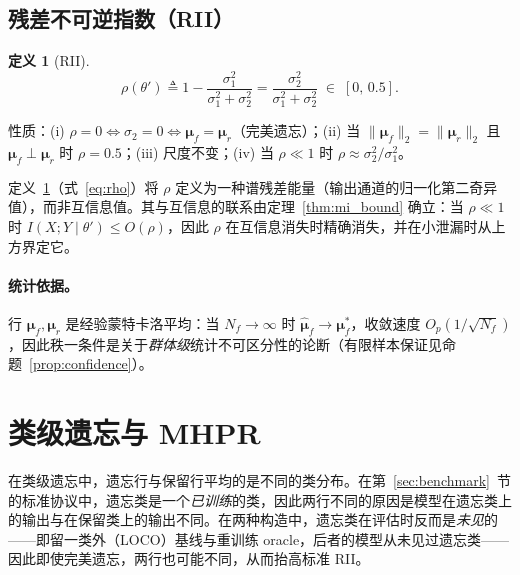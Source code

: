 \documentclass[11pt,a4paper]{article}
\newtheorem{definition}[theorem]{定义}
\newcommand{\coloneqq}{\triangleq}
\begin{document}
\subsection{残差不可逆指数（RII）}

\begin{definition}[RII]
\label{def:rii}
\begin{equation}
\rho(\theta') \coloneqq 1 - \frac{\sigma_1^2}{\sigma_1^2 + \sigma_2^2}
= \frac{\sigma_2^2}{\sigma_1^2 + \sigma_2^2}
\;\in\; [0,\,0.5].
\label{eq:rho}
\end{equation}
\end{definition}

性质：(i) $\rho = 0 \iff \sigma_2 = 0 \iff \boldsymbol{\mu}_f = \boldsymbol{\mu}_r$（完美遗忘）；(ii) 当 $\|\boldsymbol{\mu}_f\|_2=\|\boldsymbol{\mu}_r\|_2$ 且 $\boldsymbol{\mu}_f \perp \boldsymbol{\mu}_r$ 时 $\rho = 0.5$；(iii) 尺度不变；(iv) 当 $\rho \ll 1$ 时 $\rho \approx \sigma_2^2/\sigma_1^2$。

定义~\ref{def:rii}（式~\eqref{eq:rho}）将 $\rho$ 定义为一种谱残差能量（输出通道的归一化第二奇异值），而非互信息值。其与互信息的联系由定理~\ref{thm:mi_bound} 确立：当 $\rho\ll1$ 时 $I(X;Y\mid\theta')\le O(\rho)$，因此 $\rho$ 在互信息消失时精确消失，并在小泄漏时从上方界定它。

\paragraph{统计依据。}
行 $\boldsymbol{\mu}_f, \boldsymbol{\mu}_r$ 是经验蒙特卡洛平均：当 $N_f\to\infty$ 时 $\hat{\boldsymbol{\mu}}_f\to\boldsymbol{\mu}_f^*$，收敛速度 $O_p(1/\sqrt{N_f})$，因此秩一条件是关于\emph{群体级}统计不可区分性的论断（有限样本保证见命题~\ref{prop:confidence}）。

\section{类级遗忘与 MHPR}
\label{sec:class_baselines}

在类级遗忘中，遗忘行与保留行平均的是不同的类分布。在第~\ref{sec:benchmark}~节的标准协议中，遗忘类是一个\emph{已训练}的类，因此两行不同的原因是模型在遗忘类上的输出与在保留类上的输出不同。在两种构造中，遗忘类在评估时反而是\emph{未见}的——即留一类外（LOCO）基线与重训练 oracle，后者的模型从未见过遗忘类——因此即使完美遗忘，两行也可能不同，从而抬高标准 RII。
\end{document}
